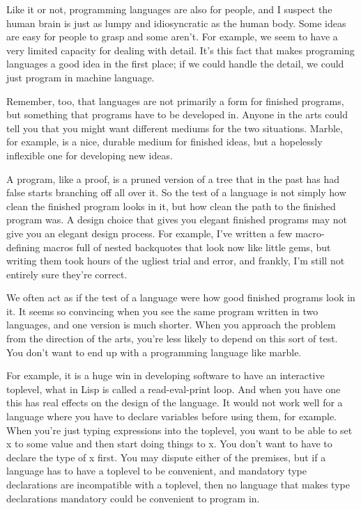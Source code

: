 \documentclass[12pt]{book}
\begin{document}
Like it or not, programming languages are also for people, and I suspect
the human brain is just as lumpy and idiosyncratic as the human body.
Some ideas are easy for people to grasp and some aren't. For example, we
seem to have a very limited capacity for dealing with detail. It's this
fact that makes programing languages a good idea in the first place; if
we could handle the detail, we could just program in machine language.

Remember, too, that languages are not primarily a form for finished
programs, but something that programs have to be developed in. Anyone in
the arts could tell you that you might want different mediums for the
two situations. Marble, for example, is a nice, durable medium for
finished ideas, but a hopelessly inflexible one for developing new
ideas.

A program, like a proof, is a pruned version of a tree that in the past
has had false starts branching off all over it. So the test of a
language is not simply how clean the finished program looks in it, but
how clean the path to the finished program was. A design choice that
gives you elegant finished programs may not give you an elegant design
process. For example, I've written a few macro-defining macros full of
nested backquotes that look now like little gems, but writing them took
hours of the ugliest trial and error, and frankly, I'm still not
entirely sure they're correct.

We often act as if the test of a language were how good finished
programs look in it. It seems so convincing when you see the same
program written in two languages, and one version is much shorter. When
you approach the problem from the direction of the arts, you're less
likely to depend on this sort of test. You don't want to end up with a
programming language like marble.

For example, it is a huge win in developing software to have an
interactive toplevel, what in Lisp is called a read-eval-print loop. And
when you have one this has real effects on the design of the language.
It would not work well for a language where you have to declare
variables before using them, for example. When you're just typing
expressions into the toplevel, you want to be able to set x to some
value and then start doing things to x. You don't want to have to
declare the type of x first. You may dispute either of the premises, but
if a language has to have a toplevel to be convenient, and mandatory
type declarations are incompatible with a toplevel, then no language
that makes type declarations mandatory could be convenient to program
in.
\end{document}
